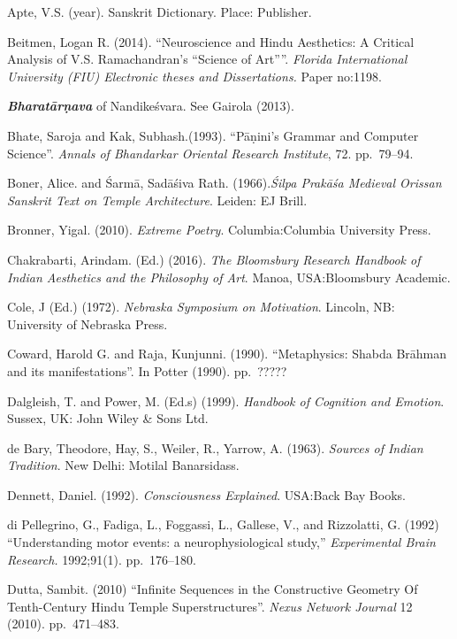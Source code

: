 \begin{thebibliography}{99}
\itemsep=2pt
Apte, V.S. (year). Sanskrit Dictionary. Place: Publisher.

Beitmen, Logan R. (2014). ``Neuroscience and Hindu Aesthetics: A Critical Analysis of V.S. Ramachandran's ``Science of Art''''. \textsl{Florida International University (FIU) Electronic theses and Dissertations.} Paper no:1198.

{\sl\bfseries Bharatārṇava} of Nandikeśvara. See Gairola (2013).

Bhate, Saroja and Kak, Subhash.(1993). “Pāṇini’s Grammar and Computer Science”. \textsl{Annals of Bhandarkar Oriental Research Institute}, 72. pp.~79--94.

Boner, Alice. and Śarmā, Sadāśiva Rath. (1966).\textsl{Śilpa Prakāśa Medieval Orissan Sanskrit Text on Temple Architecture}. Leiden: EJ Brill.

Bronner, Yigal. (2010). \textsl{Extreme Poetry}. Columbia:Columbia University Press.

Chakrabarti, Arindam. (Ed.) (2016). \textsl{The Bloomsbury Research Handbook of Indian Aesthetics and the Philosophy of Art}. Manoa, USA:Bloomsbury Academic.

Cole, J (Ed.) (1972). \textsl{Nebraska Symposium on Motivation}. Lincoln, NB: University of Nebraska Press.

Coward, Harold G. and Raja, Kunjunni. (1990). “Metaphysics: Shabda Brāhman and its manifestations”. In Potter (1990). pp.~?????

Dalgleish, T. and Power, M. (Ed.s) (1999). \textsl{Handbook of Cognition and Emotion}. Sussex, UK: John Wiley \& Sons Ltd.

de Bary, Theodore, Hay, S., Weiler, R., Yarrow, A. (1963). \textsl{Sources of Indian Tradition}. New Delhi: Motilal Banarsidass.

Dennett, Daniel. (1992). \textsl{Consciousness Explained}. USA:Back Bay Books.

di Pellegrino, G., Fadiga, L., Foggassi, L., Gallese, V., and Rizzolatti, G. (1992) “Understanding motor events: a neurophysiological study,” \textsl{Experimental Brain Research.} 1992;91(1). pp.~176--180.

Dutta, Sambit. (2010) “Infinite Sequences in the Constructive Geometry Of Tenth-Century Hindu Temple  Superstructures”. \textsl{Nexus Network Journal} 12 (2010). pp.~471--483.


\end{thebibliography}
